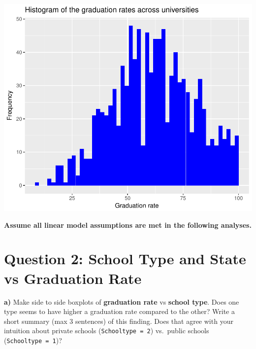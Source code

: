 \documentclass[]{article}
\newenvironment{Shaded}{\begin{snugshade}}{\end{snugshade}}
\newcommand{\CommentTok}[1]{\textcolor[rgb]{0.56,0.35,0.01}{\textit{#1}}}
\begin{document}
\begin{flushleft}\includegraphics{Midterm_11_01_2016_Answers_files/figure-latex/unnamed-chunk-11-1} \end{flushleft}

\begin{Shaded}
\end{Shaded}

\textbf{Assume all linear model assumptions are met in the following
analyses.}

\section{Question 2: School Type and State vs Graduation
Rate}\label{question-2-school-type-and-state-vs-graduation-rate}

\textbf{a)} Make side to side boxplots of \textbf{graduation rate} vs
\textbf{school type}. Does one type seems to have higher a graduation
rate compared to the other? Write a short summary (max 3 sentences) of
this finding. Does that agree with your intuition about private schools
(\texttt{Schooltype\ =\ 2}) vs.~public schools
(\texttt{Schooltype\ =\ 1})?
\end{document}
